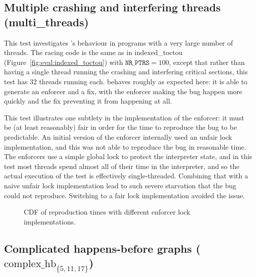 \subsection{Multiple crashing and interfering threads (multi\_threads)}

This test investigates {\implementation}'s behaviour in programs with
a very large number of threads.  The racing code is the same as in
indexed\_toctou (Figure~\ref{fig:eval:indexed_toctou}) with
$\texttt{NR\_PTRS} = 100$, except that rather than having a single
thread running the crashing and interfering critical sections, this
test has 32 threads running each.  {\Technique} behaves roughly as
expected here: it is able to generate an enforcer and a fix, with the
enforcer making the bug happen more quickly and the fix preventing it
from happening at all.

This test illustrates one subtlety in the implementation of the
enforcer: it must be (at least reasonably) fair in order for the time
to reproduce the bug to be predictable.  An initial version of the
enforcer internally used an unfair lock implementation, and this was
not able to reproduce the bug in reasonable time.  The
{\implementation} enforcers use a simple global lock to protect the
interpreter state, and in this test most threads spend almost all of
their time in the interpreter, and so the actual execution of the test
is effectively single-threaded.  Combining that with a naive unfair
lock implementation lead to such severe starvation that the bug could
not reproduce.  Switching to a fair lock implementation avoided the
issue.

\begin{figure}
  
  \caption{CDF of reproduction times with different enforcer lock
    implementations.}
  \label{fig:eval:multi_threads}
\end{figure}



\subsection{Complicated happens-before graphs ($\textrm{complex\_hb}_{\{5,11,17\}}$)}

